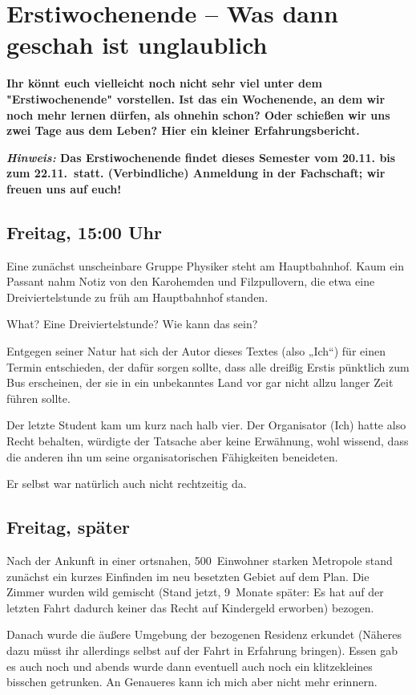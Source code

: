 \section{Erstiwochenende -- Was dann geschah ist unglaublich}
\textbf{Ihr könnt euch vielleicht noch nicht sehr viel unter dem "Erstiwochenende" vorstellen.
	Ist das ein Wochenende, an dem wir noch mehr lernen dürfen, als ohnehin schon?
	Oder schießen wir uns zwei Tage aus dem Leben?
	Hier ein kleiner Erfahrungsbericht.}

\textbf{\emph{Hinweis:}
	Das Erstiwochenende findet dieses Semester vom 20.11. bis zum 22.11.\ statt. (Verbindliche) Anmeldung in der Fachschaft; wir freuen uns auf euch!}
\begin{multicols*}{2}
\subsection{Freitag, 15:00 Uhr}
Eine zunächst unscheinbare Gruppe Physiker steht am Hauptbahnhof.
Kaum ein Passant nahm Notiz von den Karohemden und Filzpullovern, die etwa eine Dreiviertelstunde zu früh am Hauptbahnhof standen.

What?
Eine Dreiviertelstunde?
Wie kann das sein?

Entgegen seiner Natur hat sich der Autor dieses Textes (also „Ich“) für einen Termin entschieden, der dafür sorgen sollte, dass alle dreißig Erstis pünktlich zum Bus erscheinen, der sie in ein unbekanntes Land vor gar nicht allzu langer Zeit führen sollte.

Der letzte Student kam um kurz nach halb vier.
Der Organisator (Ich) hatte also Recht behalten, würdigte der Tatsache aber keine Erwähnung, wohl wissend, dass die anderen ihn um seine organisatorischen Fähigkeiten beneideten.

Er selbst war natürlich auch nicht rechtzeitig da.

\subsection{Freitag, später}
Nach der Ankunft in einer ortsnahen, 500~Einwohner starken Metropole stand zunächst ein kurzes Einfinden im neu besetzten Gebiet auf dem Plan.
Die Zimmer wurden wild gemischt (Stand jetzt, 9~Monate später: Es hat auf der letzten Fahrt dadurch keiner das Recht auf Kindergeld erworben) bezogen.

Danach wurde die äußere Umgebung der bezogenen Residenz erkundet (Näheres dazu müsst ihr allerdings selbst auf der Fahrt in Erfahrung bringen).
Essen gab es auch noch und abends wurde dann eventuell auch noch ein klitzekleines bisschen getrunken.
An Genaueres kann ich mich aber nicht mehr erinnern.


\end{multicols*}
